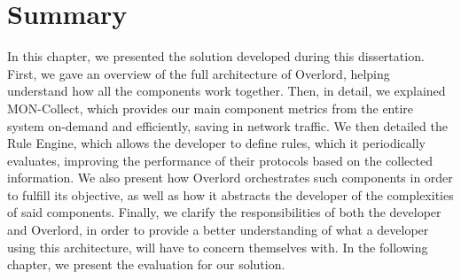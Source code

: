 
\section{Summary}
\label{sec:overlord_summary}
In this chapter, we presented the solution developed during this dissertation. First, we gave an overview of the full architecture of Overlord, helping understand how all the components work together. Then, in detail, we explained MON-Collect, which provides our main component metrics from the entire system on-demand and efficiently, saving in network traffic. We then detailed the Rule Engine, which allows the developer to define rules, which it periodically evaluates, improving the performance of their protocols based on the collected information. We also present how Overlord orchestrates such components in order to fulfill its objective, as well as how it abstracts the developer of the complexities of said components. Finally, we clarify the responsibilities of both the developer and Overlord, in order to provide a better understanding of what a developer using this architecture, will have to concern themselves with. In the following chapter, we present the evaluation for our solution. 